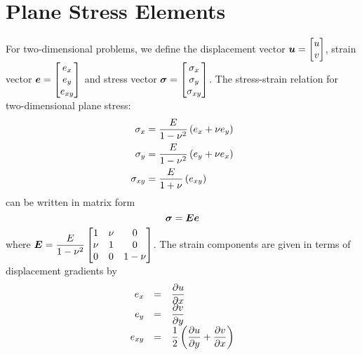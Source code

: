 
\section{Plane Stress Elements}
\vspace{-5mm}
For two-dimensional problems, we define the displacement vector 
$\vect{u} = \begin{bmatrix} 
  u \\ 
  v 
\end{bmatrix}$, strain vector $\vect{e} = \begin{bmatrix}
  e_{x} \\
  e_{y} \\ 
  e_{xy}
\end{bmatrix}$ and stress vector $\vect{\sigma} = \begin{bmatrix}
  \sigma_{x} \\
  \sigma_{y} \\
  \sigma_{xy} 
\end{bmatrix}$. The stress-strain relation for two-dimensional plane stress:
\begin{gather}
  \begin{aligned}
    \sigma_{x} &= \dfrac{E}{1-\nu^{2}}\left( e_{x}+\nu e_{y} \right) \\
    \sigma_{y} &= \dfrac{E}{1-\nu^{2}}\left( e_{y}+\nu e_{x} \right) \\
    \sigma_{xy} &= \dfrac{E}{1+\nu}\left( e_{xy} \right)
  \end{aligned}
  \label{eqn:planestress}
\end{gather}
can be written in matrix form
\begin{displaymath}
  \vect{\sigma}=\matr{E}\vect{e}
\end{displaymath}
where $\matr{E} = \dfrac{E}{1-\nu^{2}} \begin{bmatrix}
  1 & \nu & 0\\
  \nu & 1 & 0\\
  0 & 0 & 1-\nu
\end{bmatrix}$. 
The strain components are given in terms of displacement gradients by
\begin{equation}
  \begin{array}{rcl}
    e_{x} & = &  \dfrac{\partial u}{\partial x}  \\
    e_{y} & = &  \dfrac{\partial v}{\partial y}  \\
    e_{xy} & = & \dfrac{1}{2} \left(  \dfrac{\partial u}{\partial y}  +  \dfrac{\partial v}{\partial x}  \right)
  \end{array}
  \label{eqn:stcom}
\end{equation}

